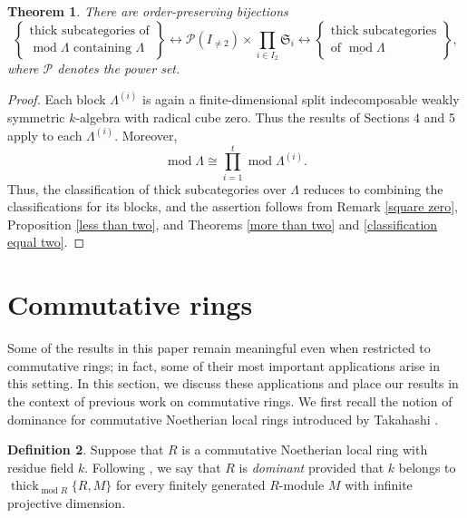 \documentclass{amsart}
\newtheorem{thm}{Theorem}[section]
\theoremstyle{definition}
\newtheorem{dfn}[thm]{Definition}
\theoremstyle{remark}
\numberwithin{equation}{thm}
\def\L{\Lambda}
\def\mod{\operatorname{mod}}
\def\thick{\operatorname{thick}}
\begin{document}
\begin{thm}\label{general classification}
There are order-preserving bijections
$$
\left\{
\begin{matrix}
\text{thick subcategories of}\\
\text{$\mod\L$ containing $\L$}
\end{matrix}
\right\}
\longleftrightarrow
\mathcal{P}(I_{\ne2})
\times
\prod_{i\in I_2}\mathfrak{S}_i
\longleftrightarrow
\left\{
\begin{matrix}
\text{thick subcategories}\\
\text{of $\underline{\mod}\L$}
\end{matrix}
\right\},
$$
where $\mathcal{P}$ denotes the power set.
\end{thm}

\begin{proof}
Each block $\L^{(i)}$ is again a finite-dimensional split indecomposable weakly symmetric $k$-algebra with radical cube zero. Thus the results of Sections 4 and 5 apply to each $\L^{(i)}$.
Moreover,
$$
\mod\L\cong\prod_{i=1}^t\mod\L^{(i)}.
$$
Thus, the classification of thick subcategories over $\L$ reduces to combining the classifications for its blocks, and the assertion follows from Remark \ref{square zero}, Proposition \ref{less than two}, and Theorems \ref{more than two} and \ref{classification equal two}.
\end{proof}

\section{Commutative rings}

Some of the results in this paper remain meaningful even when restricted to commutative rings; in fact, some of their most important applications arise in this setting.
In this section, we discuss these applications and place our results in the context of previous work on commutative rings.
We first recall the notion of dominance for commutative Noetherian local rings introduced by Takahashi \cite{T23}.

\begin{dfn}
Suppose that $R$ is a commutative Noetherian local ring with residue field $k$.
Following \cite[Corollary 10.8 and Remark 10.9]{T23}, we say that $R$ is \textit{dominant} provided that $k$ belongs to $\thick_{\mod R}\{R, M\}$ for every finitely generated $R$-module $M$ with infinite projective dimension.
\end{dfn}
\end{document}
